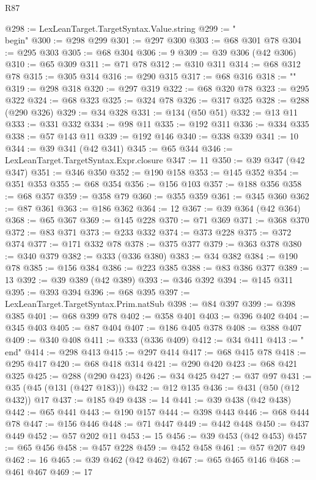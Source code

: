 \begin{lexlean}{R87}
\begin{coremodule}
@298 := LexLeanTarget.TargetSyntax.Value.string
@299 := "\\begin{"
@300 := @298 @299
@301 := @297 @300
@303 := @68 @301 @78
@304 := @295 @303
@305 := @68 @304
@306 := 9
@309 := @39 @306 (@42 @306)
@310 := @65 @309
@311 := @71 @78
@312 := @310 @311
@314 := @68 @312 @78
@315 := @305 @314
@316 := @290 @315
@317 := @68 @316
@318 := "}"
@319 := @298 @318
@320 := @297 @319
@322 := @68 @320 @78
@323 := @295 @322
@324 := @68 @323
@325 := @324 @78
@326 := @317 @325
@328 := @288 (@290 @326)
@329 := @34 @328
@331 := @134 (@50 @51)
@332 := @13 @11
@333 := @331 @332
@334 := @98 @11
@335 := @192 @311
@336 := @334 @335
@338 := @57 @143 @11
@339 := @192 @146
@340 := @338 @339
@341 := 10
@344 := @39 @341 (@42 @341)
@345 := @65 @344
@346 := LexLeanTarget.TargetSyntax.Expr.closure
@347 := 11
@350 := @39 @347 (@42 @347)
@351 := @346 @350
@352 := @190 @158
@353 := @145 @352
@354 := @351 @353
@355 := @68 @354
@356 := @156 @103
@357 := @188 @356
@358 := @68 @357
@359 := @358 @79
@360 := @355 @359
@361 := @345 @360
@362 := @87 @361
@363 := @186 @362
@364 := 12
@367 := @39 @364 (@42 @364)
@368 := @65 @367
@369 := @145 @228
@370 := @71 @369
@371 := @368 @370
@372 := @83 @371
@373 := @233 @332
@374 := @373 @228
@375 := @372 @374
@377 := @171 @332 @78
@378 := @375 @377
@379 := @363 @378
@380 := @340 @379
@382 := @333 (@336 @380)
@383 := @34 @382
@384 := @190 @78
@385 := @156 @384
@386 := @223 @385
@388 := @83 @386 @377
@389 := 13
@392 := @39 @389 (@42 @389)
@393 := @346 @392
@394 := @145 @311
@395 := @393 @394
@396 := @68 @395
@397 := LexLeanTarget.TargetSyntax.Prim.natSub
@398 := @84 @397
@399 := @398 @385
@401 := @68 @399 @78
@402 := @358 @401
@403 := @396 @402
@404 := @345 @403
@405 := @87 @404
@407 := @186 @405 @378
@408 := @388 @407
@409 := @340 @408
@411 := @333 (@336 @409)
@412 := @34 @411
@413 := "\\end{"
@414 := @298 @413
@415 := @297 @414
@417 := @68 @415 @78
@418 := @295 @417
@420 := @68 @418 @314
@421 := @290 @420
@423 := @68 @421 @325
@425 := @288 (@290 @423)
@426 := @34 @425
@427 := @37 @97
@431 := @35 (@45 (@131 (@427 @183)))
@432 := @12 @135
@436 := @431 (@50 (@12 @432)) @17
@437 := @185 @49
@438 := 14
@441 := @39 @438 (@42 @438)
@442 := @65 @441
@443 := @190 @157
@444 := @398 @443
@446 := @68 @444 @78
@447 := @156 @446
@448 := @71 @447
@449 := @442 @448
@450 := @437 @449
@452 := @57 @202 @11
@453 := 15
@456 := @39 @453 (@42 @453)
@457 := @65 @456
@458 := @457 @228
@459 := @452 @458
@461 := @57 @207 @49
@462 := 16
@465 := @39 @462 (@42 @462)
@467 := @65 @465 @146
@468 := @461 @467
@469 := 17
}
\end{coremodule}
\end{lexlean}
